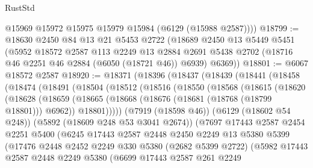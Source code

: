 \begin{lexlean}{RustStd}
\begin{coremodule}
        @15969
        @15972
        @15975
        @15979
        @15984
        (@6129 (@15988 @2587))))
@18799 := @18630
    @2450
    @84
    @13
    @21
    @5453
    @2722
    (@18689
      @2450
      @13
      @5449
      @5451
      (@5952
        @18572
        @2587
        @113
        @2249
        @13
        @2884
        @2691
        @5438
        @2702
        (@18716 @46 @2251 @46 @2884 (@6050 (@18721 @46)) @6939)
        @6369))
@18801 := @6067 @18572 @2587
@18920 := @18371
    (@18396
      (@18437
        (@18439
          (@18441
            (@18458
              (@18474
                (@18491
                  (@18504
                    (@18512
                      (@18516
                        (@18550
                          (@18568
                            (@18615
                              (@18620
                                (@18628
                                  (@18659
                                    (@18665
                                      (@18668 (@18676 (@18681 (@18768 (@18799 @18801))) @6962))
                                      @18801)))))
                            (@7919 (@18598 @46))
                            (@6129 (@18602 @54 @248))
                            (@5892 (@18609 @248 @53 @3041 @2674))
                            (@7697
                              @17443
                              @2587
                              @2454
                              @2251
                              @5400
                              (@6245
                                @17443
                                @2587
                                @2448
                                @2450
                                @2249
                                @13
                                @5380
                                @5399
                                (@17476
                                  @2448
                                  @2452
                                  @2249
                                  @330
                                  @5380
                                  (@2682 @5399 @2722)
                                  (@5982
                                    @17443
                                    @2587
                                    @2448
                                    @2249
                                    @5380
                                    (@6699
                                      @17443
                                      @2587
                                      @261
                                      @2249

\end{coremodule}
\end{lexlean}
